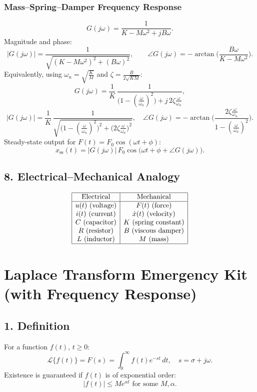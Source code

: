 \documentclass[12pt,a4paper]{article}
\begin{document}
	\subsubsection*{Mass--Spring--Damper Frequency Response}
	$$
	G(j\omega) = \frac{1}{K - M\omega^2 + j B \omega}.
	$$
	Magnitude and phase:
	$$
	|G(j\omega)| = \frac{1}{\sqrt{(K - M\omega^2)^2 + (B \omega)^2}}, \qquad
	\angle G(j\omega) = -\arctan\!\Big(\frac{B \omega}{K - M\omega^2}\Big).
	$$
	Equivalently, using $\omega_n = \sqrt{\tfrac{K}{M}}$ and $\zeta = \tfrac{B}{2\sqrt{KM}}$:
	$$
	G(j\omega) = \frac{1}{K}\,\frac{1}{\Big(1 - (\tfrac{\omega}{\omega_n})^2\Big) + j \, 2\zeta \tfrac{\omega}{\omega_n}},
	$$
	$$
	|G(j\omega)| = \frac{1}{K}\,\frac{1}{\sqrt{\Big(1 - (\tfrac{\omega}{\omega_n})^2\Big)^2 + \big(2\zeta \tfrac{\omega}{\omega_n}\big)^2}},
	\quad
	\angle G(j\omega) = -\arctan\!\Big(\frac{2\zeta \tfrac{\omega}{\omega_n}}{1 - (\tfrac{\omega}{\omega_n})^2}\Big).
	$$
	Steady-state output for $F(t) = F_0 \cos(\omega t + \phi)$:
	$$
	x_{\text{ss}}(t) = |G(j\omega)| \, F_0 \cos\big(\omega t + \phi + \angle G(j\omega)\big).
	$$
	
	\subsection*{8. Electrical--Mechanical Analogy}
	\[
	\begin{array}{|c|c|}
		\hline
		\text{Electrical} & \text{Mechanical} \\
		\hline
		u(t) \ \text{(voltage)} & F(t) \ \text{(force)} \\
		i(t) \ \text{(current)} & \dot{x}(t) \ \text{(velocity)} \\
		C \ \text{(capacitor)} & K \ \text{(spring constant)} \\
		R \ \text{(resistor)} & B \ \text{(viscous damper)} \\
		L \ \text{(inductor)} & M \ \text{(mass)} \\
		\hline
	\end{array}
	\]
	
	\pagebreak
	
	\section*{Laplace Transform Emergency Kit (with Frequency Response)}
	
	\subsection*{1. Definition}
	For a function $f(t)$, $t \ge 0$:
	$$
	\mathcal{L}\{f(t)\} = F(s) = \int_{0}^{\infty} f(t) e^{-st}\,dt, \quad s = \sigma + j\omega.
	$$
	Existence is guaranteed if $f(t)$ is of exponential order:
	$$
	|f(t)| \le M e^{\alpha t} \text{ for some } M,\alpha.
	$$
	
\end{document}
